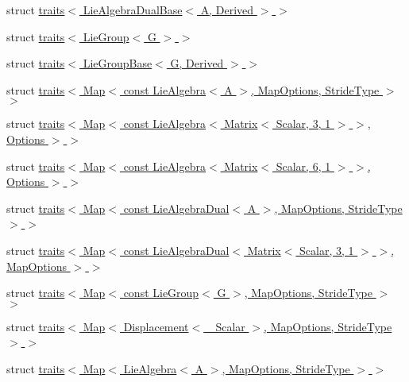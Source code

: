 \begin{DoxyCompactItemize}
\item 
struct \hyperlink{structinternal_1_1traits_3_01_lie_algebra_dual_base_3_01_a_00_01_derived_01_4_01_4}{traits$<$ Lie\+Algebra\+Dual\+Base$<$ A, Derived $>$ $>$}
\item 
struct \hyperlink{structinternal_1_1traits_3_01_lie_group_3_01_g_01_4_01_4}{traits$<$ Lie\+Group$<$ G $>$ $>$}
\item 
struct \hyperlink{structinternal_1_1traits_3_01_lie_group_base_3_01_g_00_01_derived_01_4_01_4}{traits$<$ Lie\+Group\+Base$<$ G, Derived $>$ $>$}
\item 
struct \hyperlink{structinternal_1_1traits_3_01_map_3_01const_01_lie_algebra_3_01_a_01_4_00_01_map_options_00_01_stride_type_01_4_01_4}{traits$<$ Map$<$ const Lie\+Algebra$<$ A $>$, Map\+Options, Stride\+Type $>$ $>$}
\item 
struct \hyperlink{structinternal_1_1traits_3_01_map_3_01const_01_lie_algebra_3_01_matrix_3_01_scalar_00_013_00_011480673ebb2de2c070cfdb8edee3d7437}{traits$<$ Map$<$ const Lie\+Algebra$<$ Matrix$<$ Scalar, 3, 1 $>$ $>$, Options $>$ $>$}
\item 
struct \hyperlink{structinternal_1_1traits_3_01_map_3_01const_01_lie_algebra_3_01_matrix_3_01_scalar_00_016_00_011bdc50eba447989365acf4f3cfd5e5212}{traits$<$ Map$<$ const Lie\+Algebra$<$ Matrix$<$ Scalar, 6, 1 $>$ $>$, Options $>$ $>$}
\item 
struct \hyperlink{structinternal_1_1traits_3_01_map_3_01const_01_lie_algebra_dual_3_01_a_01_4_00_01_map_options_00_01_stride_type_01_4_01_4}{traits$<$ Map$<$ const Lie\+Algebra\+Dual$<$ A $>$, Map\+Options, Stride\+Type $>$ $>$}
\item 
struct \hyperlink{structinternal_1_1traits_3_01_map_3_01const_01_lie_algebra_dual_3_01_matrix_3_01_scalar_00_013_0e77a233aa7e2f28dddf71e39df1dd866}{traits$<$ Map$<$ const Lie\+Algebra\+Dual$<$ Matrix$<$ Scalar, 3, 1 $>$ $>$, Map\+Options $>$ $>$}
\item 
struct \hyperlink{structinternal_1_1traits_3_01_map_3_01const_01_lie_group_3_01_g_01_4_00_01_map_options_00_01_stride_type_01_4_01_4}{traits$<$ Map$<$ const Lie\+Group$<$ G $>$, Map\+Options, Stride\+Type $>$ $>$}
\item 
struct \hyperlink{structinternal_1_1traits_3_01_map_3_01_displacement_3_01___scalar_01_4_00_01_map_options_00_01_stride_type_01_4_01_4}{traits$<$ Map$<$ Displacement$<$ \+\_\+\+Scalar $>$, Map\+Options, Stride\+Type $>$ $>$}
\item 
struct \hyperlink{structinternal_1_1traits_3_01_map_3_01_lie_algebra_3_01_a_01_4_00_01_map_options_00_01_stride_type_01_4_01_4}{traits$<$ Map$<$ Lie\+Algebra$<$ A $>$, Map\+Options, Stride\+Type $>$ $>$}

\end{DoxyCompactItemize}
